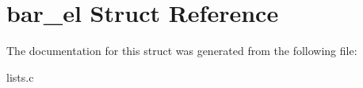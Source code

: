 \hypertarget{structbar__el}{}\section{bar\+\_\+el Struct Reference}
\label{structbar__el}


The documentation for this struct was generated from the following file\+:\begin{DoxyCompactItemize}
\item 
lists.\+c\end{DoxyCompactItemize}
